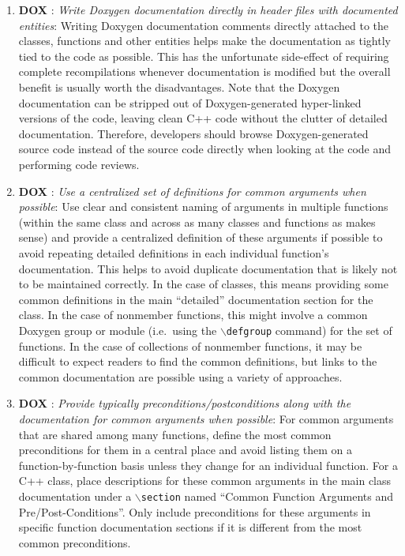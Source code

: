 \begin{enumerate}

{}\item{}\textbf{DOX }:
{}\textit{Write Doxygen documentation directly in header files with
documented entities}: Writing Doxygen documentation comments directly attached
to the classes, functions and other entities helps make the documentation as
tightly tied to the code as possible.  This has the unfortunate side-effect of
requiring complete recompilations whenever documentation is modified but the
overall benefit is usually worth the disadvantages.  Note that the Doxygen
documentation can be stripped out of Doxygen-generated hyper-linked versions
of the code, leaving clean C++ code without the clutter of detailed
documentation.  Therefore, developers should browse Doxygen-generated source
code instead of the source code directly when looking at the code and
performing code reviews.

{}\item{}\textbf{DOX }:
{}\textit{Use a centralized set of definitions for common arguments when
possible}: Use clear and consistent naming of arguments in multiple functions
(within the same class and across as many classes and functions as makes
sense) and provide a centralized definition of these arguments if possible to
avoid repeating detailed definitions in each individual function's
documentation.  This helps to avoid duplicate documentation that is likely not
to be maintained correctly.  In the case of classes, this means providing some
common definitions in the main ``detailed'' documentation section for the
class.  In the case of nonmember functions, this might involve a common
Doxygen group or module (i.e.\ using the {}\texttt{$\backslash$defgroup}
command) for the set of functions.  In the case of collections of nonmember
functions, it may be difficult to expect readers to find the common
definitions, but links to the common documentation are possible using a
variety of approaches.

{}\item{}\textbf{DOX }:
{}\textit{Provide typically preconditions/postconditions along with the
documentation for common arguments when possible}: For common arguments that
are shared among many functions, define the most common preconditions for them
in a central place and avoid listing them on a function-by-function basis
unless they change for an individual function.  For a C++ class, place
descriptions for these common arguments in the main class documentation under
a {}\texttt{$\backslash$section} named ``Common Function Arguments and
Pre/Post-Conditions''.  Only include preconditions for these arguments in
specific function documentation sections if it is different from the most
common preconditions.


\end{enumerate}
